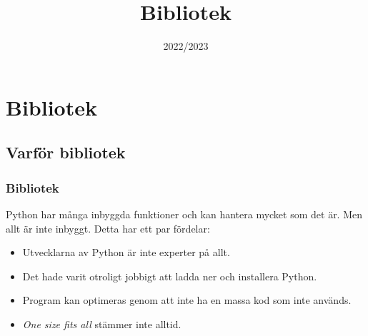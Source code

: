 \documentclass{beamer}
\begin{document}


\title{Bibliotek}
\date{2022/2023}

\maketitle

\section{Bibliotek}

\subsection{Varför bibliotek}

\begin{frame}
	\frametitle{Bibliotek}
	
	Python har många inbyggda funktioner och kan hantera mycket som det är. Men allt är inte inbyggt. Detta har ett par fördelar:
	
	\begin{itemize}
		\item Utvecklarna av Python är inte experter på allt.
		\item Det hade varit otroligt jobbigt att ladda ner och installera Python.
		\item Program kan optimeras genom att inte ha en massa kod som inte används.
		\item \textit{One size fits all} stämmer inte alltid.
	\end{itemize}

\end{frame}
\end{document}
